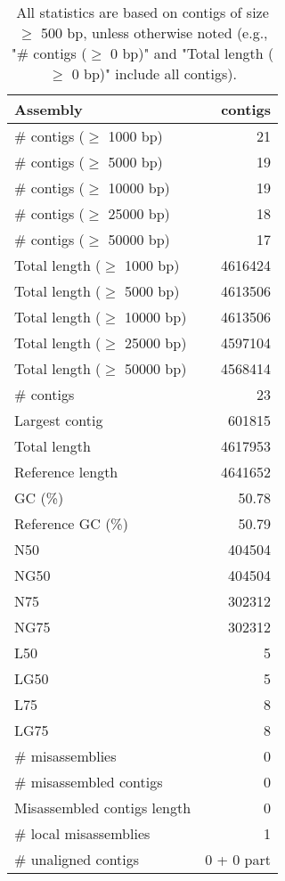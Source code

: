 \documentclass[12pt,a4paper]{article}
\begin{document}
\begin{table}[ht]
\begin{center}
\caption{All statistics are based on contigs of size $\geq$ 500 bp, unless otherwise noted (e.g., "\# contigs ($\geq$ 0 bp)" and "Total length ($\geq$ 0 bp)" include all contigs).}
\begin{tabular}{|l*{1}{|r}|}
\hline
Assembly & contigs \\ \hline
\# contigs ($\geq$ 1000 bp) & 21 \\ \hline
\# contigs ($\geq$ 5000 bp) & 19 \\ \hline
\# contigs ($\geq$ 10000 bp) & 19 \\ \hline
\# contigs ($\geq$ 25000 bp) & 18 \\ \hline
\# contigs ($\geq$ 50000 bp) & 17 \\ \hline
Total length ($\geq$ 1000 bp) & 4616424 \\ \hline
Total length ($\geq$ 5000 bp) & 4613506 \\ \hline
Total length ($\geq$ 10000 bp) & 4613506 \\ \hline
Total length ($\geq$ 25000 bp) & 4597104 \\ \hline
Total length ($\geq$ 50000 bp) & 4568414 \\ \hline
\# contigs & 23 \\ \hline
Largest contig & 601815 \\ \hline
Total length & 4617953 \\ \hline
Reference length & 4641652 \\ \hline
GC (\%) & 50.78 \\ \hline
Reference GC (\%) & 50.79 \\ \hline
N50 & 404504 \\ \hline
NG50 & 404504 \\ \hline
N75 & 302312 \\ \hline
NG75 & 302312 \\ \hline
L50 & 5 \\ \hline
LG50 & 5 \\ \hline
L75 & 8 \\ \hline
LG75 & 8 \\ \hline
\# misassemblies & 0 \\ \hline
\# misassembled contigs & 0 \\ \hline
Misassembled contigs length & 0 \\ \hline
\# local misassemblies & 1 \\ \hline
\# unaligned contigs & 0 + 0 part \\ \hline

\end{tabular}
\end{center}
\end{table}
\end{document}
